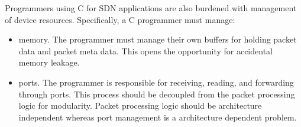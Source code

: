 Programmers using C for SDN applications are also burdened with management of
device resources. Specifically, a C programmer must manage:

\begin{itemize}
\item memory. The programmer must manage their own buffers for holding packet
data and packet meta data. This opens the opportunity for accidental
memory leakage.

\item ports. The programmer is responsible for receiving, reading, and
forwarding
through ports. This process should be decoupled from the packet processing logic
for modularity. Packet processing logic should be architecture
independent
whereas port management is a architecture dependent problem.
\end{itemize}

%
%
%
%
%

